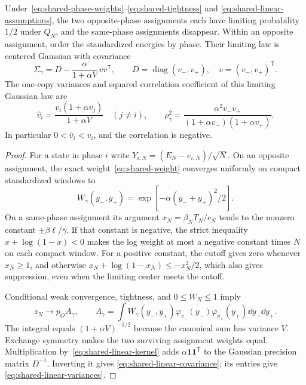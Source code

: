 \begin{theorem}
\label{thm:shared-linear}
Under~\eqref{eq:shared-phase-weights}--\eqref{eq:shared-tightness} and
\eqref{eq:shared-linear-assumptions}, the two opposite-phase assignments
each have limiting probability $1/2$ under $Q_N$, and the same-phase
assignments disappear. Within an opposite assignment, order the
standardized energies by phase. Their limiting law is centered Gaussian
with covariance
\begin{equation}
 \Sigma_\gamma=D-\frac{\alpha}{1+\alpha V}\,vv^{\mathsf T},
 \qquad D=\operatorname{diag}(v_-,v_+),\quad
 v=(v_-,v_+)^{\mathsf T}.
 \label{eq:shared-linear-covariance}
\end{equation}
The one-copy variances and squared correlation coefficient of this
limiting Gaussian law are
\begin{equation}
 \widehat v_i=\frac{v_i(1+\alpha v_j)}{1+\alpha V}\quad(j\ne i),
 \qquad
 \rho_\gamma^2=
 \frac{\alpha^2v_-v_+}{(1+\alpha v_-)(1+\alpha v_+)}.
 \label{eq:shared-linear-variances}
\end{equation}
In particular $0<\widehat v_i<v_i$, and the correlation is negative.
\end{theorem}
\begin{proof}
For a state in phase $i$ write
$Y_{i,N}=(E_N-e_{i,N})/\sqrt N$. On an opposite assignment, the exact
weight~\eqref{eq:shared-weight} converges uniformly on compact
standardized windows to
\begin{equation}
 W_\gamma(y_-,y_+)
      =\exp[-\alpha(y_-+y_+)^2/2].
 \label{eq:shared-linear-kernel}
\end{equation}
On a same-phase assignment its argument
$x_N=\beta_NT_N/c_N$ tends to the nonzero constant
$\pm\beta\ell/\gamma$. If that constant is negative, the strict
inequality $x+\log(1-x)<0$ makes the log weight at most a negative
constant times $N$ on each compact window. For a positive constant,
the cutoff gives zero whenever $x_N\ge1$, and otherwise
$x_N+\log(1-x_N)\le-x_N^2/2$, which also gives suppression, even when
the limiting center meets the cutoff.

Conditional weak convergence, tightness, and $0\le W_N\le1$ imply
\begin{equation}
 z_N\longrightarrow p_O A_\gamma,
 \qquad
 A_\gamma=\int W_\gamma(y_-,y_+)
                      \varphi_{v_-}(y_-)\varphi_{v_+}(y_+)\dd y_-\dd y_+.
 \label{eq:shared-linear-normalizer}
\end{equation}
The integral equals $(1+\alpha V)^{-1/2}$ because the canonical sum
has variance $V$. Exchange symmetry makes the two surviving assignment
weights equal. Multiplication by~\eqref{eq:shared-linear-kernel} adds
$\alpha\boldsymbol1\boldsymbol1^{\mathsf T}$ to the Gaussian precision
matrix $D^{-1}$. Inverting it gives
\eqref{eq:shared-linear-covariance}; its entries give
\eqref{eq:shared-linear-variances}.
\end{proof}

